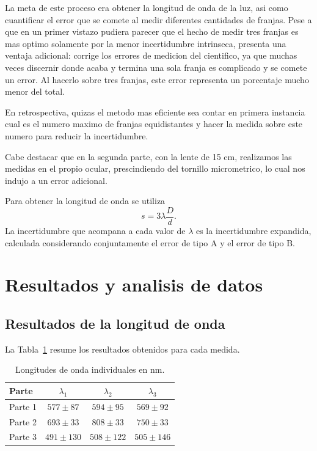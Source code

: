 \documentclass[a4paper,11pt]{article}
\begin{document}
La meta de este proceso era obtener la longitud de onda de la luz, asi como
cuantificar el error que se comete al medir diferentes cantidades de franjas.
Pese a que en un primer vistazo pudiera parecer que el hecho de medir tres franjas
es mas optimo solamente por la menor incertidumbre intrinseca, presenta una ventaja
adicional: corrige los errores de medicion del cientifico, ya que muchas veces
discernir donde acaba y termina una sola franja es complicado y se comete un error.
Al hacerlo sobre tres franjas, este error representa un porcentaje mucho menor del total.

En retrospectiva, quizas el metodo mas eficiente sea contar en primera instancia cual
es el numero maximo de franjas equidistantes y hacer la medida sobre este numero para
reducir la incertidumbre.

Cabe destacar que en la segunda parte, con la lente de 15 cm, realizamos las medidas
en el propio ocular, prescindiendo del tornillo micrometrico, lo cual nos indujo a
un error adicional.

Para obtener la longitud de onda se utiliza
\begin{equation}
s=3\lambda\frac{D}{d}.
\end{equation}
La incertidumbre que acompana a cada valor de $\lambda$ es la incertidumbre expandida,
calculada considerando conjuntamente el error de tipo A y el error de tipo B.







\section{Resultados y analisis de datos}

\subsection{Resultados de la longitud de onda}
La Tabla~\ref{tab:lambda} resume los resultados obtenidos para cada medida.

\begin{table}[H]
\centering
\begin{tabular}{lccc}
\toprule
\textbf{Parte} & $\lambda_1$ & $\lambda_2$ & $\lambda_3$ \\
\midrule
Parte 1 & $577\pm87$ & $594\pm95$ & $569\pm92$ \\
Parte 2 & $693\pm33$ & $808\pm33$ & $750\pm33$ \\
Parte 3 & $491\pm130$ & $508\pm122$ & $505\pm146$ \\
\bottomrule
\end{tabular}
\caption{Longitudes de onda individuales en nm.}
\label{tab:lambda}
\end{table}
\end{document}
